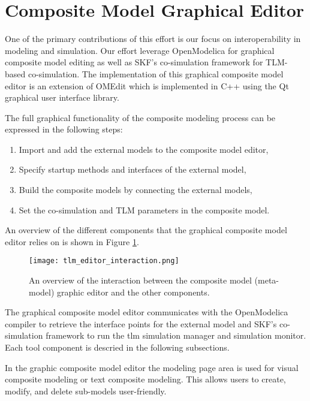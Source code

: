 \section{Composite Model Graphical Editor}
\label{sec:tlmeditor}

One of the primary contributions of this effort is our focus on interoperability in modeling and simulation.
Our effort leverage OpenModelica for graphical composite model editing as well as SKF’s co-simulation framework for TLM-based co-simulation. The implementation of this graphical composite model editor is an extension of OMEdit  which is implemented in C++ using the Qt graphical user interface library.

The full graphical functionality of the composite modeling process can be expressed in the following steps:

\begin{enumerate}
	
\item Import and add the external models to the composite model editor,
\item Specify startup methods and interfaces of the external model,
\item Build the composite models by connecting the external models,
\item Set the co-simulation and TLM parameters in the composite model.

\end{enumerate}

An overview of the different components that the graphical composite model editor relies on is shown in Figure \ref{fig:tlmeditorinteraction}. 

\begin{figure}
	\texttt{[image: tlm\_editor\_interaction.png]}
	\caption{An overview of the interaction between the composite model (meta-model) graphic editor and the other components.}
	\label{fig:tlmeditorinteraction}
\end{figure}

The graphical composite model editor communicates with the OpenModelica compiler to
retrieve the interface points for the external model and SKF’s co-simulation framework to run the \acrshort{tlm} simulation manager and simulation monitor. Each tool component is descried in the following subsections.

In the graphic composite model editor the modeling page area is used for visual composite modeling or text
composite modeling. This allows users to create, modify, and delete sub-models user-friendly. 

